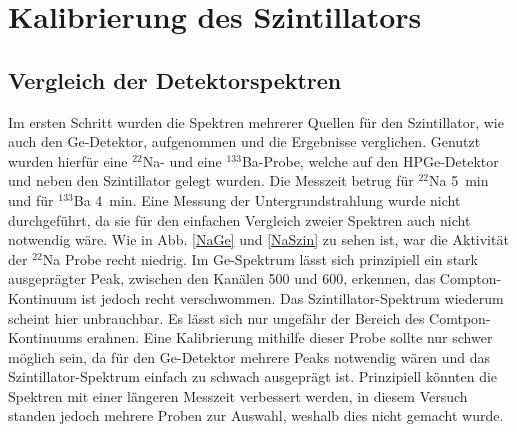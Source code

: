 \section{Kalibrierung des Szintillators}

\subsection{Vergleich der Detektorspektren}

Im ersten Schritt wurden die Spektren mehrerer Quellen für den Szintillator, wie auch den Ge-Detektor, aufgenommen und die Ergebnisse verglichen.
Genutzt wurden hierfür eine $^{22}$Na- und eine $^{133}$Ba-Probe, welche auf den HPGe-Detektor und neben den Szintillator gelegt wurden.
Die Messzeit betrug für $^{22}$Na \SI{5}{\minute} und für $^{133}$Ba \SI{4}{\minute}.
Eine Messung der Untergrundstrahlung wurde nicht durchgeführt, da sie für den einfachen Vergleich zweier Spektren auch nicht notwendig wäre.
Wie in Abb. \ref{NaGe} und \ref{NaSzin} zu sehen ist, war die Aktivität der $^{22}$Na Probe recht niedrig.
Im Ge-Spektrum lässt sich prinzipiell ein stark ausgeprägter Peak, zwischen den Kanälen 500 und 600, erkennen, das Compton-Kontinuum ist jedoch recht verschwommen.
Das Szintillator-Spektrum wiederum scheint hier unbrauchbar.
Es lässt sich nur ungefähr der Bereich des Comtpon-Kontinuums erahnen.
Eine Kalibrierung mithilfe dieser Probe sollte nur schwer möglich sein, da für den Ge-Detektor mehrere Peaks notwendig wären und das Szintillator-Spektrum einfach zu schwach ausgeprägt ist.
Prinzipiell könnten die Spektren mit einer längeren Messzeit verbessert werden, in diesem Versuch standen jedoch mehrere Proben zur Auswahl, weshalb dies nicht gemacht wurde.

